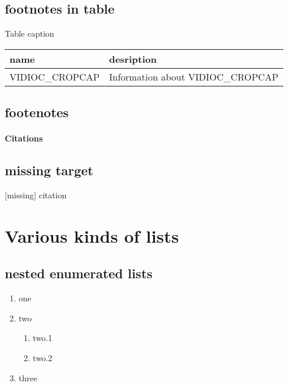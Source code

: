 \documentclass[letterpaper,10pt,english]{sphinxhowto}
\begin{document}
\subsection{footnotes in table}
\label{footnote:footnotes-in-table}

\begin{threeparttable}
\capstart\caption{Table caption \protect\footnotemark[4]}\label{footnote:id12}
\begin{tabulary}{\linewidth}{|L|L|}
\hline
\textsf{\relax 
name \protect\footnotemark[5]
} & \textsf{\relax 
desription
}\\
\hline
VIDIOC\_CROPCAP
 & 
Information about VIDIOC\_CROPCAP
\\
\hline\end{tabulary}

\end{threeparttable}


\subsection{footenotes}
\label{footnote:footenotes}\paragraph{Citations}


\subsection{missing target}
\label{footnote:missing-target}
{[}missing{]} citation


\section{Various kinds of lists}
\label{lists::doc}\label{lists:various-kinds-of-lists}

\subsection{nested enumerated lists}
\label{lists:nested-enumerated-lists}\begin{enumerate}
\item {} 
one

\item {} 
two
\begin{enumerate}
\item {} 
two.1

\item {} 
two.2

\end{enumerate}

\item {} 
three

\end{enumerate}
\end{document}
